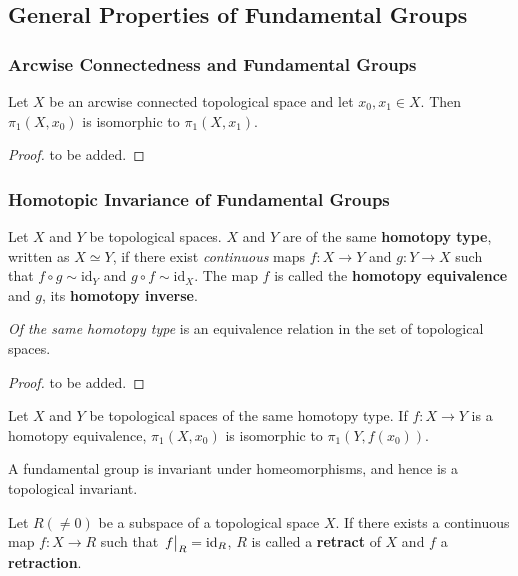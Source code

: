 \documentclass[10pt]{article}
\begin{document}
\subsection{General Properties of Fundamental Groups}
\subsubsection{Arcwise Connectedness and Fundamental Groups}
\begin{theorem}
    Let $X$ be an arcwise connected topological space and let $x_0,x_1\in X$.
    Then $\pi_1(X,x_0)$ is isomorphic to $\pi_1(X,x_1)$.
\end{theorem}
\begin{proof}
    to be added.
\end{proof}

\subsubsection{Homotopic Invariance of Fundamental Groups}

\begin{definition}
    Let $X$ and $Y$ be topological spaces.
    $X$ and $Y$ are of the same \textbf{homotopy type}, written as $X\simeq Y$, if there exist \textit{continuous} maps $f:X\to Y$ and $g:Y\to X$ such that $f\circ g\sim\text{id}_Y$ and $g\circ f\sim\text{id}_X$.
    The map $f$ is called the \textbf{homotopy equivalence} and $g$, its \textbf{homotopy inverse}.
\end{definition}

\begin{proposition}
    \textit{Of the same homotopy type} is an equivalence relation in the set of topological spaces.
\end{proposition}
\begin{proof}
    to be added.
\end{proof}

\begin{theorem}
    Let $X$ and $Y$ be topological spaces of the same homotopy type.
    If $f:X\to Y$ is a homotopy equivalence, $\pi_1(X,x_0)$ is isomorphic to $\pi_1(Y,f(x_0))$.
\end{theorem}

\begin{corollary}
    A fundamental group is invariant under homeomorphisms, and hence is a topological invariant.
\end{corollary}

\begin{definition}
    Let $R(\neq0)$ be a subspace of a topological space $X$.
    If there exists a continuous map $f:X\to R$ such that $\eval{f}_{R}=\text{id}_R$, $R$ is called a \textbf{retract} of $X$ and $f$ a \textbf{retraction}.
\end{definition}
\end{document}
